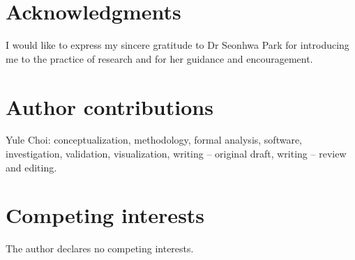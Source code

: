 \documentclass[10pt,letterpaper]{article}
\begin{document}
\section*{Acknowledgments}

I would like to express my sincere gratitude to Dr Seonhwa Park for introducing me to the practice of research and for her guidance and encouragement.

\section*{Author contributions}

Yule Choi: conceptualization, methodology, formal analysis, software, investigation, validation, visualization, writing -- original draft, writing -- review and editing.




\section*{Competing interests}

The author declares no competing interests.
\end{document}
